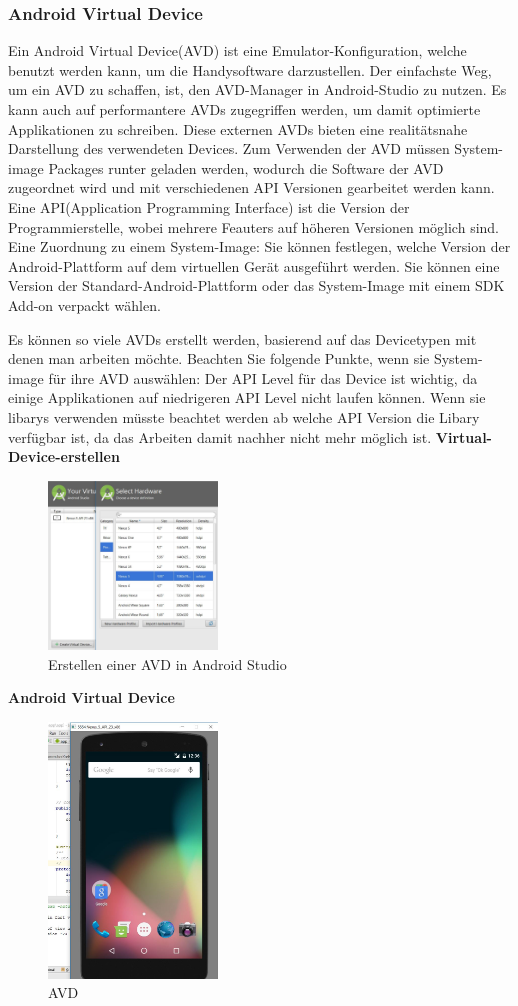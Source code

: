 \subsubsection{Android Virtual Device}
Ein Android Virtual Device(AVD) ist eine Emulator-Konfiguration, welche benutzt werden kann, um die Handysoftware darzustellen. 
Der einfachste Weg, um ein AVD zu schaffen, ist, den AVD-Manager in Android-Studio zu nutzen. 
Es kann auch auf performantere AVDs zugegriffen werden, um damit optimierte Applikationen zu schreiben.
Diese externen AVDs bieten eine realitätsnahe Darstellung des verwendeten Devices.
Zum Verwenden der AVD müssen System-image Packages runter geladen werden, wodurch die Software der AVD zugeordnet wird und mit verschiedenen API Versionen gearbeitet werden kann.
Eine API(Application Programming Interface) ist die Version der Programmierstelle, wobei mehrere Feauters auf höheren Versionen möglich sind. 
Eine Zuordnung zu einem System-Image: Sie können festlegen, welche Version der Android-Plattform auf dem virtuellen Gerät ausgeführt werden. Sie können eine Version der Standard-Android-Plattform oder das System-Image mit einem SDK Add-on verpackt wählen.

Es können so viele AVDs erstellt werden, basierend auf das Devicetypen mit denen man arbeiten möchte.
Beachten Sie folgende Punkte, wenn sie System-image für ihre AVD auswählen:
Der API Level für das Device ist wichtig, da einige Applikationen auf niedrigeren API Level nicht laufen können. Wenn sie libarys verwenden müsste beachtet werden ab welche API Version die Libary verfügbar ist, da das Arbeiten damit nachher nicht mehr möglich ist.
\textbf{Virtual-Device-erstellen}
\begin{figure}
	\centering
	\includegraphics[width=0.4\textwidth]{images/Create-virtual-device}
	\caption{Erstellen einer AVD in Android Studio}
\end{figure}

\textbf{Android Virtual Device}
\begin{figure}
	\centering
	\includegraphics[width=0.4\textwidth]{images/AVD}
	\caption{AVD}
\end{figure}

\clearpage %